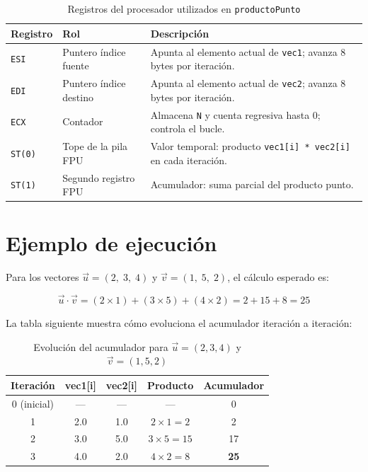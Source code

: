 \documentclass[12pt, letterpaper]{article}
\begin{document}
\begin{table}[H]
    \centering
    \begin{tabular}{@{}llp{7.5cm}@{}}
        \toprule
        \textbf{Registro} & \textbf{Rol} & \textbf{Descripción} \\
        \midrule
        \texttt{ESI} & Puntero índice fuente  & Apunta al elemento actual de \texttt{vec1}; avanza 8 bytes por iteración. \\
        \texttt{EDI} & Puntero índice destino & Apunta al elemento actual de \texttt{vec2}; avanza 8 bytes por iteración. \\
        \texttt{ECX} & Contador               & Almacena \texttt{N} y cuenta regresiva hasta 0; controla el bucle. \\
        \texttt{ST(0)} & Tope de la pila FPU  & Valor temporal: producto \texttt{vec1[i] * vec2[i]} en cada iteración. \\
        \texttt{ST(1)} & Segundo registro FPU  & Acumulador: suma parcial del producto punto. \\
        \bottomrule
    \end{tabular}
    \caption{Registros del procesador utilizados en \texttt{productoPunto}}
\end{table}

\section{Ejemplo de ejecución}

Para los vectores $\vec{u} = (2,\; 3,\; 4)$ y $\vec{v} = (1,\; 5,\; 2)$, el cálculo esperado es:

\begin{equation}
    \vec{u} \cdot \vec{v} = (2 \times 1) + (3 \times 5) + (4 \times 2) = 2 + 15 + 8 = 25
\end{equation}

La tabla siguiente muestra cómo evoluciona el acumulador iteración a iteración:

\begin{table}[H]
    \centering
    \begin{tabular}{@{}ccccc@{}}
        \toprule
        \textbf{Iteración} & \textbf{vec1[i]} & \textbf{vec2[i]} & \textbf{Producto} & \textbf{Acumulador} \\
        \midrule
        0 (inicial) & —    & —    & —                 & 0 \\
        1           & 2.0  & 1.0  & $2 \times 1 = 2$  & 2 \\
        2           & 3.0  & 5.0  & $3 \times 5 = 15$ & 17 \\
        3           & 4.0  & 2.0  & $4 \times 2 = 8$  & \textbf{25} \\
        \bottomrule
    \end{tabular}
    \caption{Evolución del acumulador para $\vec{u}=(2,3,4)$ y $\vec{v}=(1,5,2)$}
\end{table}
\end{document}
